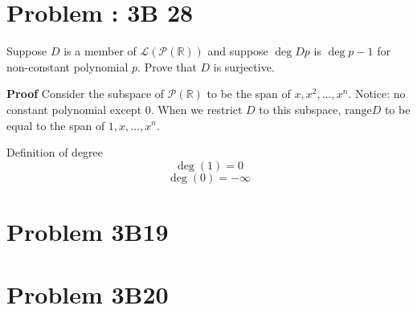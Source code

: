 \documentclass[letter]{article}
\begin{document}
\section{Problem : 3B 28} 
Suppose $D$ is a member of $\mathcal L (\mathcal P (\mathbb{R}))$ and suppose $\deg D p$ is $\deg p - 1$ for non-constant polynomial $p$. Prove that $D$ is surjective.

\textbf{Proof} Consider the subspace of $\mathcal P (\mathbb{R})$ to be the span of $x ,x^2, \ldots, x^{n}$. Notice: no constant polynomial except $0$. When we restrict $D$ to this subspace, $\text{range} D$ to be equal to the span of $1,x, \ldots, x^{n}$. 

Definition of degree 
\[
\deg(1) = 0
\] 
\[
\deg(0) = - \infty
\]

\section{Problem 3B19} 
\section{Problem 3B20}
	
\end{document}
